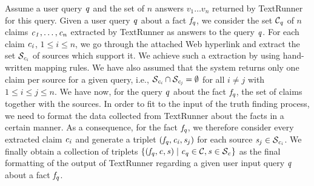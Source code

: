 Assume a user query $\mathit{q}$ and the set of $n$ answers $v_1\ldots v_n$ returned by TextRunner for this query.
Given a user query $\mathit{q}$ about a fact $\mathit{f}_{\mathit{q}}$, we consider the set $\mathcal{C}_{\mathit{q}}$ 
of $n$ claims $\mathit{c_{1}}, \ldots, \mathit{c_{n}}$ extracted by TextRunner as answers to the query $\mathit{q}$.
For each claim $\mathit{c_{i}}$, $1\leq i\leq n$, we go through the attached Web hyperlink and extract the set
$\mathcal{S}_{\mathit{c_{i}}}$ of sources which support it. We achieve such a extraction by using hand-written mapping 
rules. We have also assumed that the system returns only one claim per source for a given query, i.e., $\mathcal{S}_{\mathit{c_{i}}}
\cap \mathcal{S}_{\mathit{c_{j}}}=\emptyset$ for all $i\neq j$ with $1\leq i\leq j\leq n$. We have now, for the query
$\mathit{q}$ about the fact $\mathit{f}_{\mathit{q}}$, the set of claims together with the sources. In order to fit to 
the input of the truth finding process, we need to format the data collected from TextRunner about the 
facts in a certain manner. As a consequence, for the fact $\mathit{f}_{\mathit{q}}$, we therefore consider every extracted 
claim $\mathit{c_{i}}$ and generate a triplet $(\mathit{f}_{\mathit{q}}, \mathit{c_{i}}, \mathit{s}_{j})$ for each source $\mathit{s}_{j}\in \mathcal{S}_{\mathit{c_{i}}}$.
We finally obtain a collection of triplets $\{(\mathit{f}_{\mathit{q}}, \mathit{c_{}}, \mathit{s}_{})\mid \mathit{c_{\mathit{q}}}\in \mathcal{C}, \mathit{s}_{} \in \mathcal{S}_{\mathit{c_{}}}\}$ 
as the final formatting of the output of TextRunner regarding a given user input query $\mathit{q}$ about a fact $\mathit{f}_{\mathit{q}}$. 



